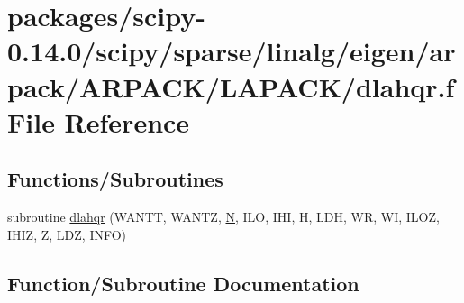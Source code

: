 \hypertarget{scipy-0_814_80_2scipy_2sparse_2linalg_2eigen_2arpack_2ARPACK_2LAPACK_2dlahqr_8f}{}\section{packages/scipy-\/0.14.0/scipy/sparse/linalg/eigen/arpack/\+A\+R\+P\+A\+C\+K/\+L\+A\+P\+A\+C\+K/dlahqr.f File Reference}
\label{scipy-0_814_80_2scipy_2sparse_2linalg_2eigen_2arpack_2ARPACK_2LAPACK_2dlahqr_8f}
\subsection*{Functions/\+Subroutines}
\begin{DoxyCompactItemize}
\item 
subroutine \hyperlink{scipy-0_814_80_2scipy_2sparse_2linalg_2eigen_2arpack_2ARPACK_2LAPACK_2dlahqr_8f_aa677995264e5de3914a3817a66e753c5}{dlahqr} (W\+A\+N\+T\+T, W\+A\+N\+T\+Z, \hyperlink{polmisc_8c_a0240ac851181b84ac374872dc5434ee4}{N}, I\+L\+O, I\+H\+I, H, L\+D\+H, W\+R, W\+I, I\+L\+O\+Z, I\+H\+I\+Z, Z, L\+D\+Z, I\+N\+F\+O)
\end{DoxyCompactItemize}


\subsection{Function/\+Subroutine Documentation}
\hypertarget{scipy-0_814_80_2scipy_2sparse_2linalg_2eigen_2arpack_2ARPACK_2LAPACK_2dlahqr_8f_aa677995264e5de3914a3817a66e753c5}{}
